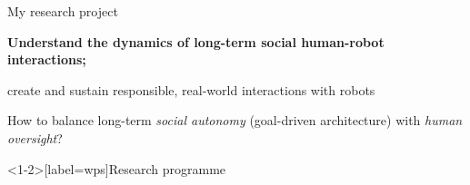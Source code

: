 \documentclass[xcolor=table]{beamer}
\begin{document}
\begin{frame}{My research project}
    \centering
    \LARGE
    \vfill
    {\bf Understand the dynamics of long-term social human-robot interactions;

    create and sustain responsible, real-world interactions with robots}
    \vfill

    \pause
    How to balance long-term \emph{social autonomy} (goal-driven architecture)
    with \emph{human oversight}?
    
\end{frame}

\begin{frame}<1-2>[label=wps]{Research programme}
    \begin{center}
\end{center}
\end{frame}
\end{document}
